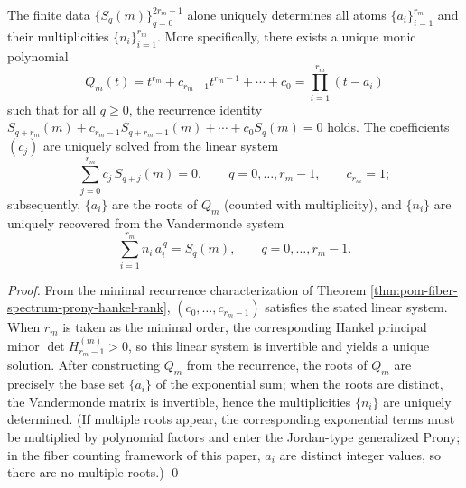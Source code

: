 \begin{theorem}\label{thm:pom-fiber-spectrum-prony-hankel-2r-reconstruction}
The finite data \(\{S_q(m)\}_{q=0}^{2r_m-1}\) alone uniquely determines all atoms \(\{a_i\}_{i=1}^{r_m}\) and their multiplicities \(\{n_i\}_{i=1}^{r_m}\).
More specifically, there exists a unique monic polynomial
\[
Q_m(t)=t^{r_m}+c_{r_m-1}t^{r_m-1}+\cdots+c_0=\prod_{i=1}^{r_m}(t-a_i)
\]
such that for all \(q\ge 0\), the recurrence identity
\(
S_{q+r_m}(m)+c_{r_m-1}S_{q+r_m-1}(m)+\cdots+c_0S_q(m)=0
\)
holds.
The coefficients \((c_j)\) are uniquely solved from the linear system
\[
\sum_{j=0}^{r_m} c_j\,S_{q+j}(m)=0,\qquad q=0,\dots,r_m-1,\qquad c_{r_m}=1;
\]
subsequently, \(\{a_i\}\) are the roots of \(Q_m\) (counted with multiplicity), and \(\{n_i\}\) are uniquely recovered from the Vandermonde system
\[
\sum_{i=1}^{r_m} n_i\,a_i^{\,q}=S_q(m),\qquad q=0,\dots,r_m-1.
\]
\end{theorem}
\begin{proof}
From the minimal recurrence characterization of Theorem \ref{thm:pom-fiber-spectrum-prony-hankel-rank},
\((c_0,\dots,c_{r_m-1})\) satisfies the stated linear system.
When \(r_m\) is taken as the minimal order, the corresponding Hankel principal minor \(\det H^{(m)}_{r_m-1}>0\), so this linear system is invertible and yields a unique solution.
After constructing \(Q_m\) from the recurrence, the roots of \(Q_m\) are precisely the base set \(\{a_i\}\) of the exponential sum;
when the roots are distinct, the Vandermonde matrix is invertible, hence the multiplicities \(\{n_i\}\) are uniquely determined.
(If multiple roots appear, the corresponding exponential terms must be multiplied by polynomial factors and enter the Jordan-type generalized Prony; in the fiber counting framework of this paper, \(a_i\) are distinct integer values, so there are no multiple roots.) \qed
\end{proof}

